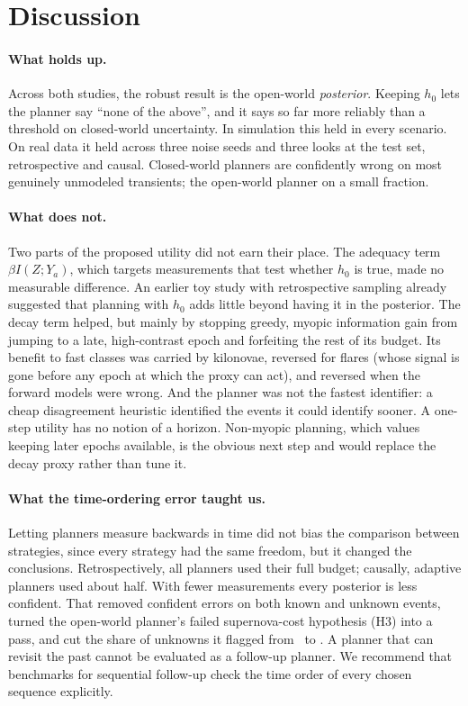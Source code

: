 \section{Discussion}\label{sec:disc}
\paragraph{What holds up.} Across both studies, the robust result is the open-world \emph{posterior}. Keeping $h_0$ lets the planner say ``none of the above'', and it says so far more reliably than a threshold on closed-world uncertainty. In simulation this held in every scenario. On real data it held across three noise seeds and three looks at the test set, retrospective and causal. Closed-world planners are confidently wrong on most genuinely unmodeled transients; the open-world planner on a small fraction.

\paragraph{What does not.} Two parts of the proposed utility did not earn their place. The adequacy term $\beta I(Z;Y_a)$, which targets measurements that test whether $h_0$ is true, made no measurable difference. An earlier toy study with retrospective sampling already suggested that planning with $h_0$ adds little beyond having it in the posterior. The decay term helped, but mainly by stopping greedy, myopic information gain from jumping to a late, high-contrast epoch and forfeiting the rest of its budget. Its benefit to fast classes was carried by kilonovae, reversed for flares (whose signal is gone before any epoch at which the proxy can act), and reversed when the forward models were wrong. And the planner was not the fastest identifier: a cheap disagreement heuristic identified the events it could identify sooner. A one-step utility has no notion of a horizon. Non-myopic planning, which values keeping later epochs available, is the obvious next step and would replace the decay proxy rather than tune it.

\paragraph{What the time-ordering error taught us.} Letting planners measure backwards in time did not bias the comparison between strategies, since every strategy had the same freedom, but it changed the conclusions. Retrospectively, all planners used their full budget; causally, adaptive planners used about half. With fewer measurements every posterior is less confident. That removed confident errors on both known and unknown events, turned the open-world planner's failed supernova-cost hypothesis (H3) into a pass, and cut the share of unknowns it flagged from \RealRFlagP\ to \RealCFlagP. A planner that can revisit the past cannot be evaluated as a follow-up planner. We recommend that benchmarks for sequential follow-up check the time order of every chosen sequence explicitly.

